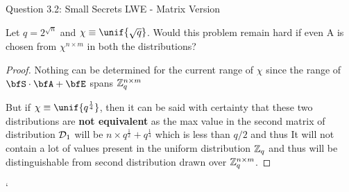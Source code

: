 \begin{solution}{Question 3.2: Small Secrets LWE - Matrix Version}\label{ques:32}
    \begin{question}
    Let $q = 2^\sqrt{n}$ and $\chi \equiv \unif{\sqrt{q}}$. Would this problem remain hard if even A is chosen from $\chi^{n \times m}$ in both the distributions?
    \end{question}
    \tcblower{}
    \begin{proof}
    Nothing can be determined for the current range of $\chi$ since the range of $\bfS\cdot\bfA+\bfE$ spans $\mathbb{Z}_q^{n\times m}$
    
    But if $\chi \equiv \unif{q^\frac{1}{4}}$, then it can be said with certainty that these two distributions are \textbf{not equivalent} as the max value in the second matrix of distribution $\mathcal{D}_1$ will be $n\times q^{\frac{1}{2}} + q^{\frac{1}{4}}$ which is less than $q/2$ and thus It will not contain a lot of values present in the uniform distribution $\mathbb{Z}_q$ and thus will be distinguishable from second distribution drawn over $\mathbb{Z}_q^{n \times m}$.
    \end{proof}
\end{solution}` 
